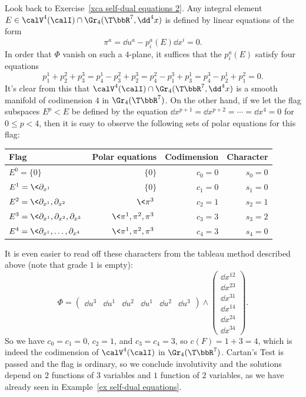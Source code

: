 \begin{example}\label{example self-dual equations 3}
    Look back to Exercise~\ref{xca self-dual equations 2}. Any integral element $E\in \calV^4(\calI)\cap \Gr_4(\T \bbR^7,\dd^4 x)$ is defined by linear equations of the form 
    \[\pi^a=\dd u^a-p_i^a(E)\dd x^i=0.\]
    In order that $\Phi$ vanish on such a $4$-plane, it suffices that the $p^a_i(E)$ satisfy four equations 
    \[p_1^1+p_2^2+p_3^3=p_4^1-p_3^2+p_2^3=p_4^2-p_1^3+p_3^1=p_4^3-p_2^1+p_1^2=0.\]
    It's clear from this that $\calV^4(\calI)\cap\Gr_4(\T\bbR^7,\dd^4 x)$ is a smooth manifold of codimension $4$ in $\Gr_4(\T\bbR^7)$. On the other hand, if we let the flag subspaces $E^p<E$ be defined by the equation $\dd x^{p+1}=\dd x^{p+2}=\cdots =\dd x^4=0$ for $0\leq p< 4$, then it is easy to observe the following sets of polar equations for this flag:
    \begin{center}
        \begin{tabular}{l r r r} 
         Flag & Polar equations & Codimension & Character \\ [0.5ex] 
         \hline
         $E^0=\{0\}$ & $\{0\}$ & $c_0=0$ & $s_0=0$ \\ 
         $E^1=\<\partial_{x^1}\>$ & $\{0\}$ & $c_1=0$ & $s_1=0$ \\ 
         $E^2=\<\partial_{x^1},\partial_{x^2}\>$ & $\<\pi^3\>$ & $c_2=1$ & $s_2=1$ \\ 
         $E^3=\<\partial_{x^1},\partial_{x^2},\partial_{x^3}\>$ & $\<\pi^1,\pi^2,\pi^3\>$ & $c_3=3$ & $s_3=2$ \\ 
         $E^4=\<\partial_{x^1},\ldots,\partial_{x^4}\>$ & $\<\pi^1,\pi^2,\pi^3\>$ & $c_4=3$ & $s_4=0$ \\ 
         \hline
        \end{tabular}
    \end{center}
    It is even easier to read off these characters from the tableau method described above (note that grade $1$ is empty):
    \[\Phi=
    \left(\begin{array}{|c|cc|ccc}
        \boxed{\dd u^3} & \boxed{\dd u^1} & \boxed{\dd u^2} & \dd u^1 &\dd u^2 & \dd u^3
    \end{array}\right)\wedge
    \left(\begin{array}{c}
        \hline
        \dd x^{12}\\\hline 
        \dd x^{23} \\
        \dd x^{31}\\\hline 
        \dd x^{14}\\
        \dd x^{24}\\
        \dd x^{34}
    \end{array}\right).
    \]
    So we have $c_0=c_1=0$, $c_2=1$, and $c_3=c_4=3$, so $c(F)=1+3=4$, which is indeed the codimension of $\calV^4(\calI)$ in $\Gr_4(\T \bbR^7)$. Cartan's Test is passed and the flag is ordinary, so we conclude involutivity and the solutions depend on $2$ functions of $3$ variables and $1$ function of $2$ variables, as we have already seen in Example~\ref{ex self-dual equations}.
\end{example}



